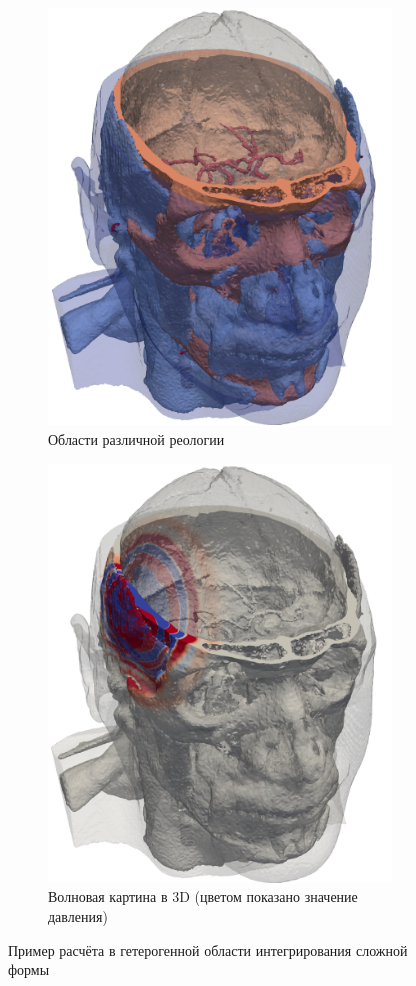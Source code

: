 \begin{figure}[H]
\centering
\begin{subfigure}{.5\textwidth}
  \centering
  \includegraphics[width=0.7\linewidth]{pictures/skull/materials-all.png}
  \caption{Области различной реологии}
  \label{fig:materials-3d}
\end{subfigure}%
\begin{subfigure}{.5\textwidth}
  \centering
  \includegraphics[width=0.7\linewidth]{pictures/skull/waves-3d.png}
  \caption{Волновая картина в 3D (цветом показано значение давления)}
  \label{fig:waves-3d}
\end{subfigure}
\caption{Пример расчёта в гетерогенной области интегрирования сложной формы}
\label{fig:results-3d}
\end{figure}

